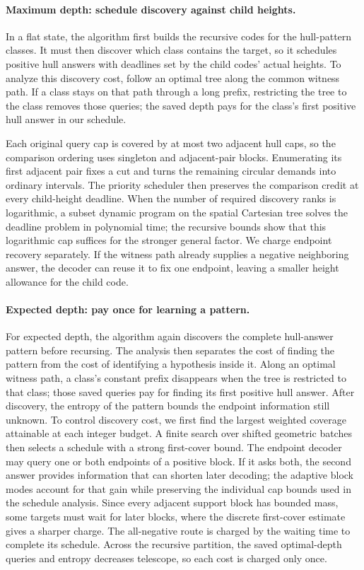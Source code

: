 \paragraph{Maximum depth: schedule discovery against child heights.}
In a flat state, the algorithm first builds the recursive codes for
the hull-pattern classes. It must then discover which class contains
the target, so it schedules positive hull answers with deadlines set
by the child codes' actual heights. To analyze this discovery cost,
follow an optimal tree along the common witness path. If a class stays
on that path through a long prefix, restricting the tree to the class
removes those queries; the saved depth pays for the class's first
positive hull answer in our schedule.

Each original query cap is covered by at most two adjacent hull caps,
so the comparison ordering uses singleton and adjacent-pair blocks.
Enumerating its first adjacent pair fixes a cut and turns the remaining
circular demands into ordinary intervals. The priority scheduler then
preserves the comparison credit at every child-height deadline. When
the number of required discovery ranks is logarithmic, a subset dynamic
program on the spatial Cartesian tree solves the deadline problem in
polynomial time; the recursive bounds show that this logarithmic cap
suffices for the stronger general factor. We charge endpoint recovery
separately. If the witness path already supplies a negative neighboring
answer, the decoder can reuse it to fix one endpoint, leaving a smaller
height allowance for the child code.

\paragraph{Expected depth: pay once for learning a pattern.}
For expected depth, the algorithm again discovers the complete
hull-answer pattern before recursing. The analysis then separates the
cost of finding the pattern from the cost of identifying a hypothesis
inside it. Along an optimal witness path, a class's constant prefix
disappears when the tree is restricted to that class; those saved
queries pay for finding its first positive hull answer. After
discovery, the entropy of the pattern bounds the endpoint information
still unknown. To control discovery cost, we first find the largest
weighted coverage attainable at each integer budget. A finite search
over shifted geometric batches then selects a schedule with a strong
first-cover bound. The endpoint decoder may query one or both endpoints
of a positive block. If it asks both, the second answer provides
information that can shorten later decoding; the adaptive block modes
account for that gain while preserving the individual cap bounds used
in the schedule analysis. Since every adjacent support block has
bounded mass, some targets must wait for later blocks, where the
discrete first-cover estimate gives a sharper charge. The all-negative
route is charged by the waiting time to complete its schedule. Across
the recursive partition, the saved optimal-depth queries and entropy
decreases telescope, so each cost is charged only once.

